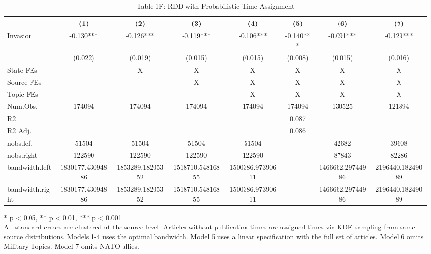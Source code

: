 \begin{table}[!t]
\caption{Table 1F: RDD with Probabilistic Time Assignment} 
\fontsize{12.0pt}{14.4pt}\selectfont
\begin{tabular*}{\linewidth}{@{\extracolsep{\fill}}lccccccc}
\toprule
  & (1) & (2) & (3) & (4) & (5) & (6) & (7) \\ 
\midrule\addlinespace[2.5pt]
Invasion & -0.130*** & -0.126*** & -0.119*** & -0.106*** & -0.140*** & -0.091*** & -0.129*** \\ 
{} & {(0.022)} & {(0.019)} & {(0.015)} & {(0.015)} & {(0.008)} & {(0.015)} & {(0.016)} \\ 
State FEs & - & X & X & X & X & X & X \\ 
Source FEs & - & - & X & X & X & X & X \\ 
Topic FEs & - & - & - & X & X & X & X \\ 
Num.Obs. & 174094 & 174094 & 174094 & 174094 & 174094 & 130525 & 121894 \\ 
R2 &  &  &  &  & 0.087 &  &  \\ 
R2 Adj. &  &  &  &  & 0.086 &  &  \\ 
nobs.left & 51504 & 51504 & 51504 & 51504 &  & 42682 & 39608 \\ 
nobs.right & 122590 & 122590 & 122590 & 122590 &  & 87843 & 82286 \\ 
bandwidth.left & 1830177.43094886 & 1853289.18205352 & 1518710.54816855 & 1500386.97390611 &  & 1466662.29744986 & 2196440.18249089 \\ 
bandwidth.right & 1830177.43094886 & 1853289.18205352 & 1518710.54816855 & 1500386.97390611 &  & 1466662.29744986 & 2196440.18249089 \\ 
\bottomrule
\end{tabular*}
\begin{minipage}{\linewidth}
* p < 0.05, ** p < 0.01, *** p < 0.001\\
All standard errors are clustered at the source level. Articles without
publication times are assigned times via KDE sampling from same-source
distributions. Models 1-4 uses the optimal bandwidth. Model 5 uses a linear
specification with the full set of articles. Model 6 omits Military Topics.
Model 7 omits NATO allies.\\
\end{minipage}
\end{table}

